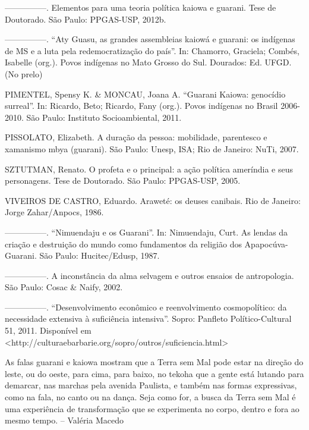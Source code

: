 \documentclass{article}
\begin{document}
{}---{}---{}---{}---{}---. Elementos para uma teoria pol\'itica kaiowa e
guarani. Tese de Doutorado. S\~ao Paulo: PPGAS-USP, 2012b. 

{}---{}---{}---{}---{}---. {\textquotedblleft}Aty Guasu, as grandes
assembleias kaiow\'a e guarani: os ind\'igenas de MS e a luta pela
redemocratiza\c{c}\~ao do pa\'is{\textquotedblright}. In: Chamorro,
Graciela; Comb\'es, Isabelle (org.). Povos ind\'igenas no Mato Grosso
do Sul. Dourados: Ed. UFGD. (No prelo)

PIMENTEL, Spensy K. \& MONCAU, Joana A. {\textquotedblleft}Guarani
Kaiowa: genoc\'idio surreal{\textquotedblright}. In: Ricardo, Beto;
Ricardo, Fany (org.). Povos ind\'igenas no Brasil 2006-2010. S\~ao
Paulo: Instituto Socioambiental, 2011.

PISSOLATO, Elizabeth. A dura\c{c}\~ao da pessoa: mobilidade, parentesco
e xamanismo mbya (guarani). S\~ao Paulo: Unesp, ISA; Rio de Janeiro:
NuTi, 2007.

SZTUTMAN, Renato. O profeta e o principal: a a\c{c}\~ao pol\'itica
amer\'india e seus personagens. Tese de Doutorado. S\~ao Paulo:
PPGAS-USP, 2005.

VIVEIROS DE CASTRO, Eduardo. Arawet\'e: os deuses canibais. Rio de
Janeiro: Jorge Zahar/Anpocs, 1986.

{}---{}---{}---{}---{}---. {\textquotedblleft}Nimuendaju e os
Guarani{\textquotedblright}. In: Nimuendaju, Curt. As lendas da
cria\c{c}\~ao e destrui\c{c}\~ao do mundo como fundamentos da
religi\~ao dos Apapoc\'uva-Guarani. S\~ao Paulo: Hucitec/Edusp, 1987.

{}---{}---{}---{}---{}---. A inconst\^ancia da alma selvagem e outros
ensaios de antropologia. S\~ao Paulo: Cosac \& Naify, 2002.

{}---{}---{}---{}---{}---. {\textquotedblleft}Desenvolvimento
econ\^omico e reenvolvimento cosmopol\'itico: da necessidade extensiva
\`a sufici\^encia intensiva{\textquotedblright}. Sopro: Panfleto
Pol\'itico-Cultural 51, 2011. Dispon\'ivel em
{\textless}http://culturaebarbarie.org/sopro/outros/suficiencia.html{\textgreater}

As falas guarani e kaiowa mostram que a Terra sem Mal pode estar na
dire\c{c}\~ao do leste, ou do oeste, para cima, para baixo, no tekoha
que a gente est\'a lutando para demarcar, nas marchas pela avenida
Paulista, e tamb\'em nas formas expressivas, como na fala, no canto ou
na dan\c{c}a. Seja como for, a busca da Terra sem Mal \'e uma
experi\^encia de transforma\c{c}\~ao que se experimenta no corpo,
dentro e fora ao mesmo tempo. -- Val\'eria Macedo
\end{document}
